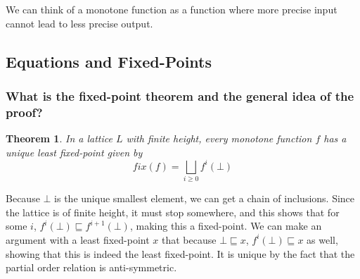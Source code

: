 \documentclass[12pt]{article}
\newenvironment{proof-idea}{\noindent{\bf Proof Idea}\hspace*{1em}}{\qed\bigskip}
\newtheorem*{theorem}{Theorem}
\theoremstyle{remark}
\theoremstyle{remark}
\begin{document}
We can think of a monotone function as a function where more precise input cannot lead to less precise output.

\subsection{Equations and Fixed-Points}
\subsubsection{What is the fixed-point theorem and the general idea of the proof?}
\begin{theorem}
    In a lattice $L$ with finite height, every monotone function $f$ has a unique least fixed-point given by
    \[fix(f) = \bigsqcup_{i \geq 0} f^i (\bot)\]
\end{theorem}
\begin{proof-idea}
Because $\bot$ is the unique smallest element, we can get a chain of inclusions. Since the lattice is of finite height, it must stop somewhere, and this shows that for some $i$, $f^i(\bot) \sqsubseteq f^{i+1}(\bot)$, making this a fixed-point. We can make an argument with a least fixed-point $x$ that because $\bot \sqsubseteq x$, $f^i(\bot) \sqsubseteq x$ as well, showing that this is indeed the least fixed-point. It is unique by the fact that the partial order relation is anti-symmetric.
\end{proof-idea}

\end{document}
